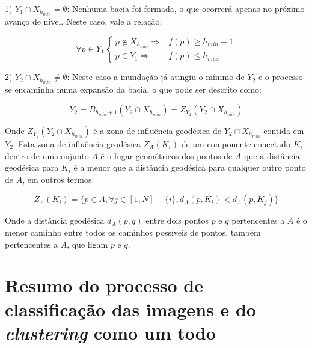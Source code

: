 1) $ Y_1 \cap X_{h_{min}} = \emptyset $: Nenhuma bacia foi formada, o que ocorrerá
apenas no próximo avanço de nível. Neste caso, vale a relação:

\begin{equation}\label{eq:watershed_caso1}
  \forall p \in Y_1 \left\{
    \begin{array}{rc}
      p \notin X_{h_{min}} \Rightarrow & f(p) \ge h_{min} + 1 \\
                 p \in Y_1 \Rightarrow & f(p) \le h_{max}
    \end{array}
  \right.
\end{equation}

2) $ Y_2 \cap X_{h_{min}} \neq \emptyset $: Neste caso a inundação já atingiu o
mínimo de $ Y_2 $ e o processo se encaminha numa expansão da bacia, o que pode
ser descrito como:

\begin{equation}\label{eq:watershed_caso21}
  Y_2 = B_{h_{min} + 1}(Y_2 \cap X_{h_{min}}) = Z_{Y_2}(Y_2 \cap X_{h_{min}})
\end{equation}

Onde $ Z_{Y_2}(Y_2 \cap X_{h_{min}}) $ é a zona de influência geodésica de
$ Y_2 \cap X_{h_{min}} $ contida em $ Y_2 $. Esta zona de influência
geodésica $ Z_A(K_i) $ de um componente conectado $ K_i $ dentro de um conjunto $ A $
é o lugar geométricos dos pontos
de $ A $ que a distância geodésica para $ K_i $ é a menor que a distância
geodésica para qualquer outro ponto de $ A $, em outros termos:

\begin{equation}\label{eq:watershed_caso22}
  Z_A(K_i) = \{ p \in A, \forall j \in [1, N] - \{ i \}, d_A(p, K_i) < d_A(p, K_j) \}
\end{equation}

Onde a distância geodésica $ d_A(p, q) $ entre dois pontos $ p $ e $ q $
pertencentes a $ A $ é o menor caminho entre todos os caminhos possíveis de
pontos, também pertencentes a $ A $, que ligam $ p $ e $ q $.

\section{Resumo do processo de classificação das imagens e do \textit{clustering}
como um todo}\label{sec:resumo_clustering}

